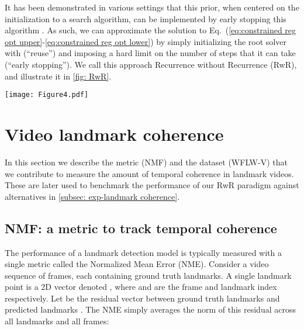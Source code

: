 \documentclass[10pt,twocolumn,letterpaper]{article}
\begin{document}
It has been demonstrated in various settings that this prior, when centered on the initialization to a search algorithm, can be implemented by early stopping this algorithm \cite{Sjoberg1992Overtraining, Bishop1995RegularizationComplexityControl, Santos1996EquivalenceRegAndTruncation, Grant2018RecastingMAMLasHierBayes}. As such, we can approximate the solution to Eq.~(\ref{eq:constrained reg opt upper}-\ref{eq:constrained reg opt lower}) by simply initializing the root solver with  (``reuse'') and imposing a hard limit on the number of steps that it can take (``early stopping''). We call this approach Recurrence without Recurrence (RwR), and illustrate it in \cref{fig: RwR}.

\begin{figure*}[t!]
  \centering
   \texttt{[image: Figure4.pdf]}
   \caption{Recurrence without recurrence (RwR) on video data, from an LDEQ that was trained on still images. We use the initialization  for the first frame, and then reuse  for . Combined with early stopping, this is equivalent to regularizing the fixed point  so that it is more temporally coherent with all its predecessors.} \label{fig: RwR}
\end{figure*}

\section{Video landmark coherence}

In this section we describe the metric (NMF) and the dataset (WFLW-V) that we contribute to measure the amount of temporal coherence in landmark videos. These are later used to benchmark the performance of our RwR paradigm against alternatives in \cref{subsec: exp-landmark coherence}. 

\subsection{NMF: a metric to track temporal coherence}

The performance of a landmark detection model is typically measured with a single metric called the Normalized Mean Error (NME). Consider a video sequence of  frames, each containing  ground truth landmarks. A single landmark point is a 2D vector denoted , where  and  are the frame and landmark index respectively. Let  be the residual vector between ground truth landmarks and predicted landmarks . The NME simply averages the  norm of this residual across all landmarks and all frames:
\end{document}
